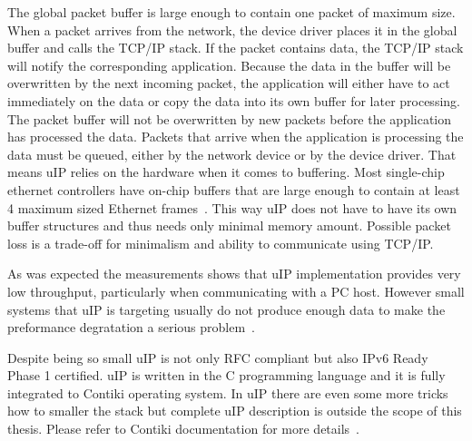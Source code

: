 The global packet buffer is large enough to contain one packet of maximum size.
When a packet arrives from the network, the device driver places it in the
global buffer and calls the TCP/IP stack.
If the packet contains data, the TCP/IP stack will notify the corresponding application.
Because the data in the buffer will be overwritten by the next incoming packet,
the application will either have to act immediately on the data or copy the data into
its own buffer for later processing.
The packet buffer will not be overwritten by new packets before the application has processed the data.
Packets that arrive when the application is processing the data must be queued,
either by the network device or by the device driver.
That means uIP relies on the hardware when it comes to buffering.
Most single-chip ethernet controllers have on-chip buffers
that are large enough to contain at least 4 maximum sized Ethernet frames~\cite{contiki-docs}.
This way uIP does not have to have its own buffer structures and thus
needs only minimal memory amount.
Possible packet loss is a trade-off for minimalism and ability to communicate using TCP/IP.

As was expected the measurements shows that uIP implementation provides very low
throughput, particularly when communicating with a PC host.
However small systems that uIP is targeting usually do not produce enough data
to make the preformance degratation a serious problem~\cite{thesis-towards}.

Despite being so small uIP is not only RFC compliant but also IPv6 Ready Phase 1 certified.
uIP is written in the C programming language and it is fully integrated to Contiki operating system.
In uIP there are even some more tricks how to smaller the stack
but complete uIP description is outside the scope of this thesis.
Please refer to Contiki documentation for more details~\cite{contiki-docs}.
